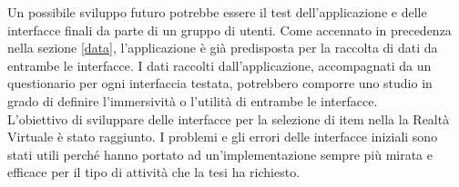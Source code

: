 \documentclass[target=bach,aauheader=]{thud}
\begin{document}
Un possibile sviluppo futuro potrebbe essere il test dell'applicazione e delle interfacce finali da parte di un gruppo di utenti.
Come accennato in precedenza nella sezione \ref{data}, l'applicazione è già predisposta per la raccolta di dati da entrambe le interfacce.
I dati raccolti dall'applicazione, accompagnati da un questionario per ogni interfaccia testata, potrebbero comporre uno studio in grado di definire l'immersività o l'utilità di entrambe le interfacce. \\

L'obiettivo di sviluppare delle interfacce per la selezione di item nella la Realtà Virtuale è stato raggiunto.
I problemi e gli errori delle interfacce iniziali sono stati utili perché hanno portato ad un'implementazione sempre più mirata e efficace per il tipo di attività che la tesi ha richiesto.


\backmatter




\end{document}
